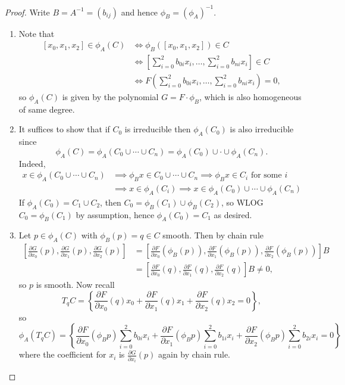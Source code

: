 \documentclass{article}
\theoremstyle{definition}
\begin{document}
\begin{proof}
Write $B=A^{-1}=(b_{ij})$ and hence $\phi_B=(\phi_A)^{-1}$.
\begin{enumerate}
\item Note that
\[
\begin{aligned}
[x_0,x_1,x_2]\in\phi_A(C) &\iff \phi_B([x_0,x_1,x_2])\in C \\
&\iff \left[\sum_{i=0}^2 b_{0i}x_i,\ldots,\sum_{i=0}^2b_{ni}x_i\right]\in C \\
&\iff F\left(\sum_{i=0}^2 b_{0i}x_i,\ldots,\sum_{i=0}^2b_{ni}x_i\right)=0,
\end{aligned}
\]
so $\phi_A(C)$ is given by the polynomial $G=F\cdot\phi_B$, which is also homogeneous of same degree.
\item It suffices to show that if $C_0$ is irreducible then $\phi_A(C_0)$ is also irreducible since
\[
\phi_A(C)=\phi_A(C_0\cup\cdots\cup C_n)=\phi_A(C_0)\cup\cdot\cup\phi_A(C_n).
\]
Indeed,
\[
\begin{aligned}
x\in \phi_A(C_0\cup\cdots\cup C_n) &\implies \phi_B x\in C_0\cup\cdots\cup C_n \implies \phi_B x\in C_i\text{ for some }i\\
&\implies x\in \phi_A(C_i)\implies x\in\phi_A(C_0)\cup\cdots\cup\phi_A(C_n)
\end{aligned}
\]
If $\phi_A(C_0)=C_1\cup C_2$, then $C_0=\phi_B(C_1)\cup\phi_B(C_2)$, so WLOG $C_0=\phi_B(C_1)$ by assumption, hence $\phi_A(C_0)=C_1$ as desired.
\item Let $p\in\phi_A(C)$ with $\phi_B(p)=q\in C$ smooth. Then by chain rule
\[
\begin{aligned}
\left[\frac{\partial G}{\partial x_0}(p),\frac{\partial G}{\partial x_1}(p),\frac{\partial G}{\partial x_2}(p)\right]&=\left[\frac{\partial F}{\partial x_0}(\phi_B(p)),\frac{\partial F}{\partial x_1}(\phi_B(p)),\frac{\partial F}{\partial x_2}(\phi_B(p))\right]B \\
&=\left[\frac{\partial F}{\partial x_0}(q),\frac{\partial F}{\partial x_1}(q),\frac{\partial F}{\partial x_2}(q)\right]B\neq 0,
\end{aligned}
\]
so $p$ is smooth. Now recall
\[
T_qC=\left\{\frac{\partial F}{\partial x_0}(q)x_0+\frac{\partial F}{\partial x_1}(q)x_1+\frac{\partial F}{\partial x_2}(q)x_2=0\right\},
\]
so
\[
\phi_A(T_qC)=\left\{\frac{\partial F}{\partial x_0}(\phi_Bp)\sum_{i=0}^2 b_{0i}x_i+\frac{\partial F}{\partial x_1}(\phi_Bp)\sum_{i=0}^2 b_{1i}x_i+\frac{\partial F}{\partial x_2}(\phi_Bp)\sum_{i=0}^2 b_{2i}x_i=0\right\}
\]
where the coefficient for $x_i$ is $\frac{\partial G}{\partial x_i}(p)$ again by chain rule.
\end{enumerate}
\end{proof}
\end{document}
